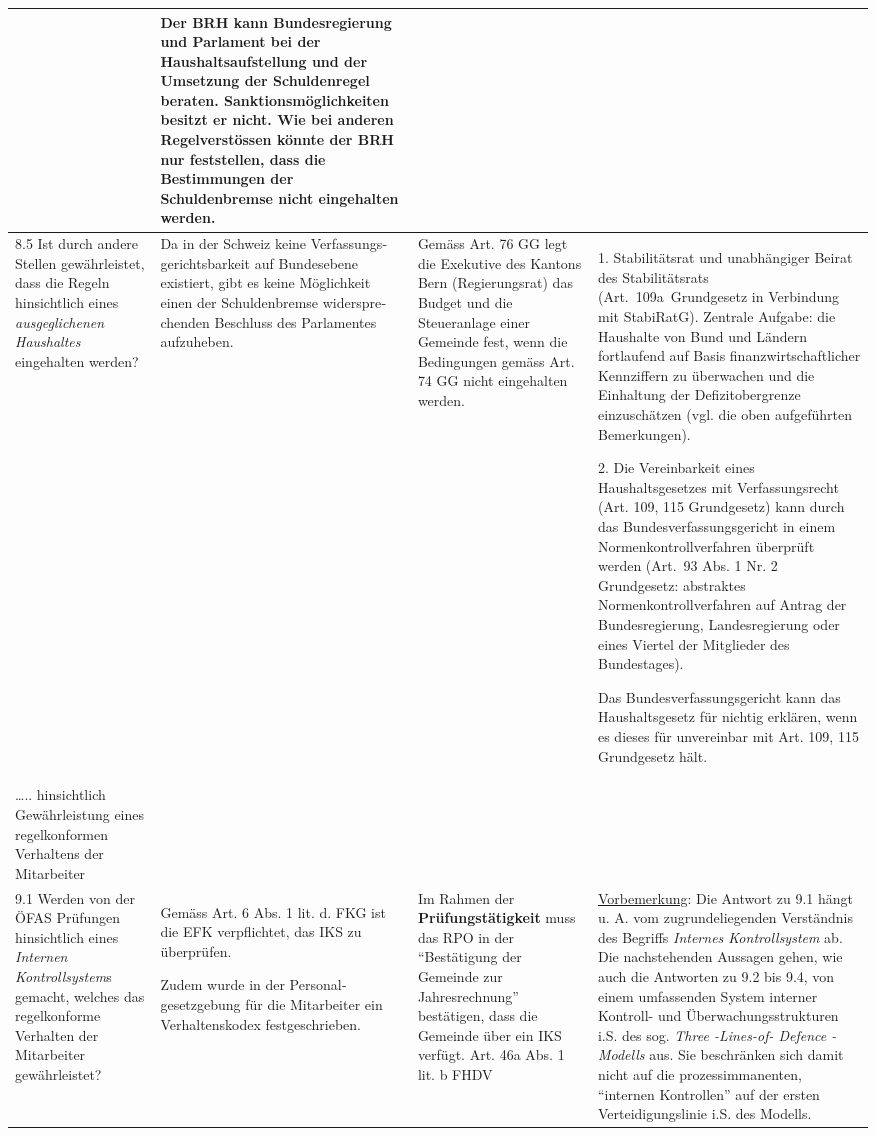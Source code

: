 \documentclass[10pt]{article}
\begin{document}
\begin{landscape}
\begin{center}
\begin{longtable}{|p{4cm}|p{5cm}|p{7.5cm}|p{7.5cm}|}
 & Der BRH kann Bundesregierung und Parlament bei der Haushaltsaufstellung und der Umsetzung der Schuldenregel beraten. Sanktionsmöglichkeiten besitzt er nicht. Wie bei anderen Regelverstössen könnte der BRH nur feststellen, dass die Bestimmungen der Schuldenbremse nicht eingehalten werden. \\
\hline
8.5 Ist durch andere Stellen gewährleistet, dass die Regeln hinsichtlich eines \textit{ausgeglichenen Haushaltes} eingehalten werden? & Da in der Schweiz keine Verfassungs­gerichtsbarkeit auf Bundesebene existiert, gibt es keine Möglichkeit einen der Schuldenbremse widerspre­chenden Beschluss des Parlamentes aufzuheben. & Gemäss Art. 76 GG legt die Exekutive des Kantons Bern (Regierungsrat) das Budget und die Steueranlage einer Gemeinde fest, wenn die Bedingungen gemäss Art. 74 GG nicht eingehalten werden. & 1. Stabilitätsrat und unabhängiger Beirat des Stabilitätsrats (Art.~109a~Grundgesetz in Verbindung mit StabiRatG). Zentrale Aufgabe: die Haushalte von Bund und Ländern fortlaufend auf Basis finanzwirtschaftlicher Kennziffern zu überwachen und die Einhaltung der Defizitobergrenze einzuschätzen (vgl. die oben aufgeführten Bemerkungen).

2. Die Vereinbarkeit eines Haushaltsgesetzes mit Verfassungsrecht (Art. 109, 115 Grundgesetz) kann durch das Bundesverfassungsgericht in einem Normenkontrollverfahren überprüft werden (Art.~93 Abs. 1 Nr. 2 Grundgesetz: abstraktes Normenkontrollverfahren auf Antrag der Bundesregierung, Landesregierung oder eines Viertel der Mitglieder des Bundestages). 

Das Bundesverfassungsgericht kann das Haushaltsgesetz für nichtig erklären, wenn es dieses für unvereinbar mit Art. 109, 115 Grundgesetz hält. 

 \\
\hline
….. hinsichtlich Gewährleistung eines regelkonformen Verhaltens der Mitarbeiter &  &  &  \\
\hline
9.1 Werden von der ÖFAS Prüfungen hinsichtlich eines \textit{Internen Kontrollsystem}s gemacht, welches das regelkonforme Verhalten der Mitarbeiter gewährleistet? & Gemäss Art. 6 Abs. 1 lit. d. FKG ist die EFK verpflichtet, das IKS zu überprüfen.

Zudem wurde in der Personal­gesetzgebung für die Mitarbeiter ein Verhaltens­kodex festgeschrieben.

 & Im Rahmen der \textbf{Prüfungstätigkeit} muss das RPO in der “{}Bestätigung der Gemeinde zur Jahresrechnung”{} bestätigen, dass die Gemeinde über ein IKS verfügt. Art. 46a Abs. 1 lit. b FHDV & \underline{Vorbemerkung}: Die Antwort zu 9.1 hängt u. A. vom zugrundeliegenden Verständnis des Begriffs \textit{Internes Kontrollsystem} ab. Die nachstehenden Aussagen gehen, wie auch die Antworten zu 9.2 bis 9.4, von einem umfassenden System interner Kontroll- und Überwachungsstrukturen i.S. des sog. \textit{Three -Lines-of- Defence - Modells} aus. Sie beschränken sich damit nicht auf die prozess­immanenten, “{}internen Kontrollen”{} auf der ersten Verteidigungslinie i.S. des Modells.


\end{longtable}
\end{center}
\end{landscape}
\end{document}
